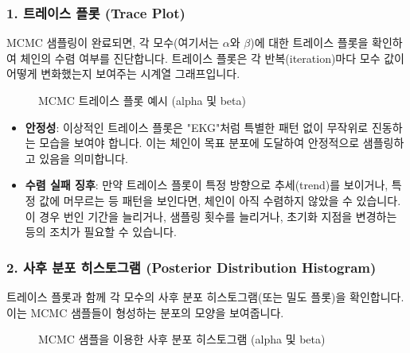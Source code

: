 \documentclass[11pt,a4paper]{book}
\theoremstyle{definition}
\begin{document}
\subsubsection*{1. 트레이스 플롯 (Trace Plot)}
MCMC 샘플링이 완료되면, 각 모수(여기서는 $\alpha$와 $\beta$)에 대한 트레이스 플롯을 확인하여 체인의 수렴 여부를 진단합니다. 트레이스 플롯은 각 반복(iteration)마다 모수 값이 어떻게 변화했는지 보여주는 시계열 그래프입니다.

\begin{figure}[h!]
    \centering
    \caption{MCMC 트레이스 플롯 예시 (alpha 및 beta)}
    \label{fig:mcmc_trace_plot}
\end{figure}

\begin{infobox}[title=트레이스 플롯 해석]
\begin{itemize}
    \item \textbf{안정성}: 이상적인 트레이스 플롯은 "EKG"처럼 특별한 패턴 없이 무작위로 진동하는 모습을 보여야 합니다. 이는 체인이 목표 분포에 도달하여 안정적으로 샘플링하고 있음을 의미합니다.
    \item \textbf{수렴 실패 징후}: 만약 트레이스 플롯이 특정 방향으로 추세(trend)를 보이거나, 특정 값에 머무르는 등 패턴을 보인다면, 체인이 아직 수렴하지 않았을 수 있습니다. 이 경우 번인 기간을 늘리거나, 샘플링 횟수를 늘리거나, 초기화 지점을 변경하는 등의 조치가 필요할 수 있습니다.
\end{itemize}
\end{infobox}

\subsubsection*{2. 사후 분포 히스토그램 (Posterior Distribution Histogram)}
트레이스 플롯과 함께 각 모수의 사후 분포 히스토그램(또는 밀도 플롯)을 확인합니다. 이는 MCMC 샘플들이 형성하는 분포의 모양을 보여줍니다.

\begin{figure}[h!]
    \centering
    \caption{MCMC 샘플을 이용한 사후 분포 히스토그램 (alpha 및 beta)}
    \label{fig:mcmc_posterior_hist}
\end{figure}
\end{document}
